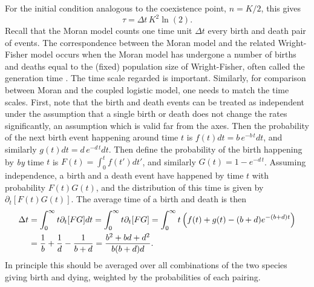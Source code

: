 For the initial condition analogous to the coexistence point, $n = K/2$, this gives
\begin{equation*}
\tau = \Delta t\,K^2\ln\left(2\right).
\end{equation*}
Recall that the Moran model counts one time unit $\Delta t$ every birth and death pair of events. 
The correspondence between the Moran model and the related Wright-Fisher model occurs when the Moran model has undergone a number of births and deaths equal to the (fixed) population size of Wright-Fisher, often called the generation time \cite{um}. 
The time scale regarded is important. 
Similarly, for comparison between Moran and the coupled logistic model, one needs to match the time scales. 
First, note that the birth and death events can be treated as independent under the assumption that a single birth or death does not change the rates significantly, an assumption which is valid far from the axes. 
Then the probability of the next birth event happening around time $t$ is $f(t)dt = b\,e^{-b\,t}dt$, and similarly $g(t)dt = d\,e^{-d\,t}dt$. 
Then define the probability of the birth happening by \emph{by} time $t$ is $F(t) = \int_0^t f(t') dt'$, and similarly $G(t) = 1-e^{-d\,t}$. 
Assuming independence, a birth and a death event have happened by time $t$ with probability $F(t)G(t)$, and the distribution of this time is given by $\partial_t[F(t)G(t)]$. 
The average time of a birth and death is then
\begin{align*}
 \Delta t &= \int_{0}^{\infty} t \partial_t[FG] dt = \int_{0}^{\infty} t \partial_t[FG] = \int_{0}^{\infty} t \left(f(t) + g(t) - (b+d)e^{-(b+d)t}\right) \notag \\
          &= \frac{1}{b} + \frac{1}{d} - \frac{1}{b+d} = \frac{b^2 + b d + d^2}{b (b+d) d}.
\end{align*}
In principle this should be averaged over all combinations of the two species giving birth and dying, weighted by the probabilities of each pairing. 
